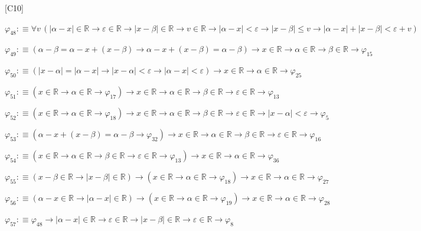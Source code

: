 \begin{fullproof}{[C10]}
\begin{abbrevlist}
\item $\varphi_{48} :\equiv \forall v\,(\lvert \alpha - x \rvert \in \mathbb{R} \to \varepsilon \in \mathbb{R} \to \lvert x - \beta \rvert \in \mathbb{R} \to v \in \mathbb{R} \to \lvert \alpha - x \rvert < \varepsilon \to \lvert x - \beta \rvert \leq v \to \lvert \alpha - x \rvert + \lvert x - \beta \rvert < \varepsilon + v)$
\item $\varphi_{49} :\equiv (\alpha - \beta = \alpha - x + (x - \beta) \to \alpha - x + (x - \beta) = \alpha - \beta) \to x \in \mathbb{R} \to \alpha \in \mathbb{R} \to \beta \in \mathbb{R} \to \varphi_{15}$
\item $\varphi_{50} :\equiv (\lvert x - \alpha \rvert = \lvert \alpha - x \rvert \to \lvert x - \alpha \rvert < \varepsilon \to \lvert \alpha - x \rvert < \varepsilon) \to x \in \mathbb{R} \to \alpha \in \mathbb{R} \to \varphi_{25}$
\item $\varphi_{51} :\equiv (x \in \mathbb{R} \to \alpha \in \mathbb{R} \to \varphi_{17}) \to x \in \mathbb{R} \to \alpha \in \mathbb{R} \to \beta \in \mathbb{R} \to \varepsilon \in \mathbb{R} \to \varphi_{13}$
\item $\varphi_{52} :\equiv (x \in \mathbb{R} \to \alpha \in \mathbb{R} \to \varphi_{18}) \to x \in \mathbb{R} \to \alpha \in \mathbb{R} \to \beta \in \mathbb{R} \to \varepsilon \in \mathbb{R} \to \lvert x - \alpha \rvert < \varepsilon \to \varphi_{5}$
\item $\varphi_{53} :\equiv (\alpha - x + (x - \beta) = \alpha - \beta \to \varphi_{32}) \to x \in \mathbb{R} \to \alpha \in \mathbb{R} \to \beta \in \mathbb{R} \to \varepsilon \in \mathbb{R} \to \varphi_{16}$
\item $\varphi_{54} :\equiv (x \in \mathbb{R} \to \alpha \in \mathbb{R} \to \beta \in \mathbb{R} \to \varepsilon \in \mathbb{R} \to \varphi_{13}) \to x \in \mathbb{R} \to \alpha \in \mathbb{R} \to \varphi_{36}$
\item $\varphi_{55} :\equiv (x - \beta \in \mathbb{R} \to \lvert x - \beta \rvert \in \mathbb{R}) \to (x \in \mathbb{R} \to \alpha \in \mathbb{R} \to \varphi_{18}) \to x \in \mathbb{R} \to \alpha \in \mathbb{R} \to \varphi_{27}$
\item $\varphi_{56} :\equiv (\alpha - x \in \mathbb{R} \to \lvert \alpha - x \rvert \in \mathbb{R}) \to (x \in \mathbb{R} \to \alpha \in \mathbb{R} \to \varphi_{19}) \to x \in \mathbb{R} \to \alpha \in \mathbb{R} \to \varphi_{28}$
\item $\varphi_{57} :\equiv \varphi_{48} \to \lvert \alpha - x \rvert \in \mathbb{R} \to \varepsilon \in \mathbb{R} \to \lvert x - \beta \rvert \in \mathbb{R} \to \varepsilon \in \mathbb{R} \to \varphi_{8}$

\end{abbrevlist}
\end{fullproof}
